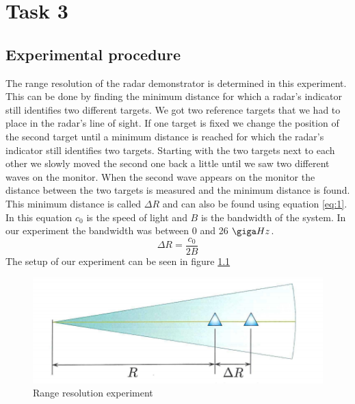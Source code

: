 \documentclass[final]{scrreprt} %
\begin{document}
\chapter{Task 3}

\section{Experimental procedure}
\label{sec:experimentalprocedure}
The range resolution of the radar demonstrator is determined in this experiment.
This can be done by finding the minimum distance for which a radar's indicator still identifies two different targets. 
We got two reference targets that we had to place in the radar's line of sight.
If one target is fixed we change the position of the second target until a minimum distance is reached for which the radar's indicator still identifies two targets.
Starting with the two targets next to each other we slowly moved the second one back a little until we saw two different waves on the monitor.
When the second wave appears on the monitor the distance between the two targets is measured and the minimum distance is found.
This minimum distance is called $\Delta R$ and can also be found using equation \ref{eq:1}. 
In this equation $c_{0}$ is the speed of light and $B$ is the bandwidth of the system.
In our experiment the bandwidth was between 0 and 26 $\giga Hz$. 
\begin{equation} 
\label{eq:1}
\Delta R= \frac{c_{0}}{2B} 
\end{equation}
The setup of our experiment can be seen in figure \ref{fig:range}
\begin{figure}[h]
	\begin{center}
		\includegraphics[width=\linewidth/2]{resources/meet3.png}
	\end{center}
	\caption{Range resolution experiment}
	\label{fig:range}
\end{figure}
\end{document}
